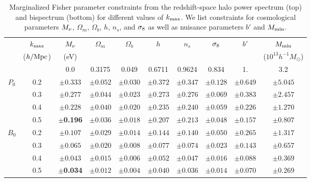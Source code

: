 \begin{table}
    \caption{Marginalized Fisher parameter constraints from the redshift-space halo power 
    spectrum (top) and bispectrum (bottom) for different values of $k_{\rm max}$. We list 
    constraints for cosmological parameters $M_\nu$, $\Omega_m$, $\Omega_b$, $h$, $n_s$, 
    and $\sigma_8$ as well as nuisance parameters $b'$ and $M_{\rm min}$.} 
\begin{center} 
    \begin{tabular}{cccccccccc} \toprule
         & $k_{\rm max}$ & $M_\nu$ & $\Omega_m$ & $\Omega_b$ & $h$ & $n_s$ & $\sigma_8$ & $b'$ & $M_{\rm min}$ \\
         & ({\footnotesize $h/{\rm Mpc}$}) &({\footnotesize eV}) & & & & & & & ({\footnotesize $10^{13} h^{-1}M_\odot$}) \\[3pt] \hline\hline

            &     & 0.0 & 0.3175 & 0.049 & 0.6711 & 0.9624 & 0.834 & 1. & 3.2  \\ 
    $P_0$  & 0.2 &$\pm0.333$ & $\pm0.052$ & $\pm0.030$ & $\pm0.372$ & $\pm0.347$ & $\pm0.128$ & $\pm0.649$ & $\pm5.045$\\
           & 0.3 &$\pm0.277$ & $\pm0.044$ & $\pm0.023$ & $\pm0.273$ & $\pm0.276$ & $\pm0.069$ & $\pm0.383$ & $\pm2.457$\\
           & 0.4 &$\pm0.228$ & $\pm0.040$ & $\pm0.020$ & $\pm0.235$ & $\pm0.240$ & $\pm0.059$ & $\pm0.226$ & $\pm1.270$\\
           & 0.5 &$\pm${\bf 0.196}& $\pm0.036$ & $\pm0.018$ & $\pm0.207$ & $\pm0.213$ & $\pm0.048$ & $\pm0.157$ & $\pm0.807$\\\hline
                   
    $B_0$  & 0.2 &$\pm0.107$ & $\pm0.029$ & $\pm0.014$ & $\pm0.144$ & $\pm0.140$ & $\pm0.050$ & $\pm0.265$ & $\pm1.317$\\
           & 0.3 &$\pm0.065$ & $\pm0.020$ & $\pm0.008$ & $\pm0.077$ & $\pm0.074$ & $\pm0.023$ & $\pm0.143$ & $\pm0.657$\\
           & 0.4 &$\pm0.043$ & $\pm0.015$ & $\pm0.006$ & $\pm0.052$ & $\pm0.047$ & $\pm0.016$ & $\pm0.088$ & $\pm0.369$\\
           & 0.5 &$\pm${\bf 0.034}& $\pm0.012$ & $\pm0.004$ & $\pm0.040$ & $\pm0.036$ & $\pm0.014$ & $\pm0.070$ & $\pm0.269$\\[3pt]

    \hline
\end{tabular} \label{tab:forecast}
\end{center}
\end{table}

